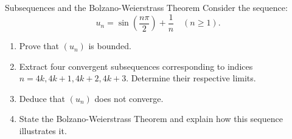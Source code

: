 \begin{exercise}{Subsequences and the Bolzano-Weierstrass Theorem}
Consider the sequence:
\[
u_n = \sin\left(\frac{n\pi}{2}\right) + \frac{1}{n} \quad (n \ge 1).
\]
\begin{enumerate}[leftmargin=1.5em,itemsep=2pt]
  \item Prove that $(u_n)$ is bounded.
  \item Extract four convergent subsequences corresponding to indices $n = 4k, 4k+1, 4k+2, 4k+3$. Determine their respective limits.
  \item Deduce that $(u_n)$ does not converge.
  \item State the Bolzano-Weierstrass Theorem and explain how this sequence illustrates it.
\end{enumerate}
\end{exercise}

\begin{tabletworkspace}[5.0cm]
\end{tabletworkspace}

